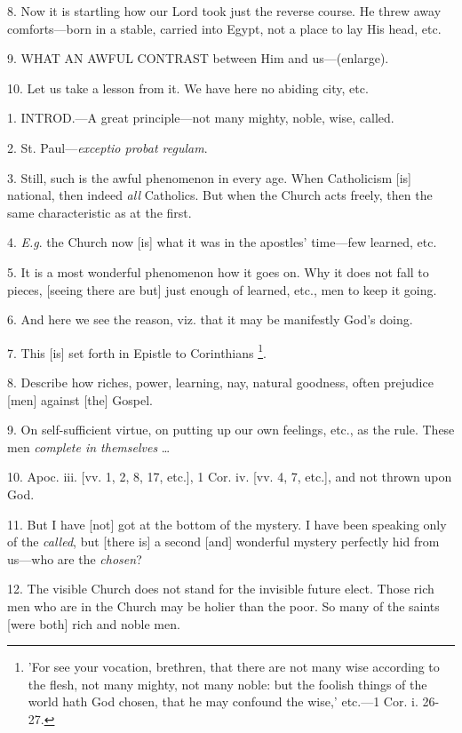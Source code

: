 8. Now it is startling how our Lord took just the
reverse course. He threw away comforts—born in a stable, carried
into Egypt, not a place to lay His head, etc.

9. WHAT AN
AWFUL CONTRAST
between Him and us—(enlarge).

10. Let us take a lesson from it. We have here no
abiding city, etc.


1. INTROD.—A
great principle—not many mighty, noble, wise, called.

2. St. Paul—\emph{exceptio probat regulam}.

3. Still, such is the awful phenomenon in every
age. When Catholicism [is] national, then indeed \emph{all} Catholics.
But when the Church acts freely, then the same characteristic as at
the first.

4. \emph{E.g}. the Church now [is] what it was in
the apostles' time—few learned, etc.

5. It is a most wonderful phenomenon how it goes
on. Why it does not fall to pieces, [seeing there are but] just enough
of learned, etc., men to keep it going.

6. And here we see the reason, viz. that it may
be manifestly God's doing.

7. This [is] set forth in Epistle to Corinthians
\footnote{'For see your vocation,
brethren, that there are not many wise according to the flesh, not
many mighty, not many noble: but the foolish things of the world hath
God chosen, that he may confound the wise,' etc.—1 Cor. i. 26-27.}.

8. Describe how riches, power, learning, nay,
natural goodness, often prejudice [men] against [the] Gospel.

9. On self-sufficient virtue, on putting up our
own feelings, etc., as the rule. These men \emph{complete in themselves}
…

10. Apoc. iii. [vv. 1, 2, 8, 17, etc.], 1 Cor.
iv. [vv. 4, 7, etc.], and not thrown upon God.

11. But I have [not] got at the bottom of the
mystery. I have been speaking only of the \emph{called}, but [there
is] a second [and] wonderful mystery perfectly hid from us—who are
the \emph{chosen}?

12. The visible Church does not stand for the
invisible future elect. Those rich men who are in the Church may
be holier than the poor. So many of the saints [were both] rich and
noble men.

